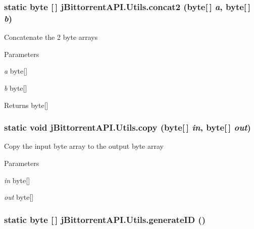 \hypertarget{classj_bittorrent_a_p_i_1_1_utils_ad86687ff941621b6c25fd61a9964ad99}{
\subsubsection[{concat2}]{\setlength{\rightskip}{0pt plus 5cm}static byte \mbox{[}$\,$\mbox{]} jBittorrentAPI.Utils.concat2 (byte\mbox{[}$\,$\mbox{]} {\em a}, \/  byte\mbox{[}$\,$\mbox{]} {\em b})}}
\label{classj_bittorrent_a_p_i_1_1_utils_ad86687ff941621b6c25fd61a9964ad99}
Concatenate the 2 byte arrays 
\begin{DoxyParams}{Parameters}
\item[{\em a}]byte\mbox{[}\mbox{]} \item[{\em b}]byte\mbox{[}\mbox{]} \end{DoxyParams}
\begin{DoxyReturn}{Returns}
byte\mbox{[}\mbox{]} 
\end{DoxyReturn}
\hypertarget{classj_bittorrent_a_p_i_1_1_utils_aaae31a73f74ed3c0e7a6155324c4ca10}{
\subsubsection[{copy}]{\setlength{\rightskip}{0pt plus 5cm}static void jBittorrentAPI.Utils.copy (byte\mbox{[}$\,$\mbox{]} {\em in}, \/  byte\mbox{[}$\,$\mbox{]} {\em out})}}
\label{classj_bittorrent_a_p_i_1_1_utils_aaae31a73f74ed3c0e7a6155324c4ca10}
Copy the input byte array to the output byte array 
\begin{DoxyParams}{Parameters}
\item[{\em in}]byte\mbox{[}\mbox{]} \item[{\em out}]byte\mbox{[}\mbox{]} \end{DoxyParams}
\hypertarget{classj_bittorrent_a_p_i_1_1_utils_afffec79721b859efde246c770b7b8eef}{
\subsubsection[{generateID}]{\setlength{\rightskip}{0pt plus 5cm}static byte \mbox{[}$\,$\mbox{]} jBittorrentAPI.Utils.generateID ()}}
